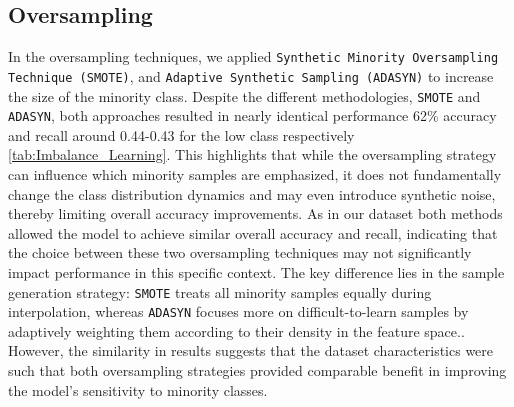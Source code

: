 \subsection{Oversampling}
In the oversampling techniques, we applied \texttt{Synthetic Minority Oversampling Technique (SMOTE)}, 
and \texttt{Adaptive Synthetic Sampling (ADASYN)} to increase the size of the minority class. 
Despite the different methodologies, \texttt{SMOTE} and \texttt{ADASYN}, both approaches resulted in nearly identical performance 62\% accuracy 
and recall around 0.44-0.43 for the low class respectively \ref{tab:Imbalance_Learning}. 
This highlights that while the oversampling strategy can influence which minority samples are emphasized, 
it does not fundamentally change the class distribution dynamics and may even introduce synthetic noise, thereby limiting overall accuracy improvements.
As in our dataset both methods allowed the model to 
achieve similar overall accuracy and recall, indicating that the choice between these two oversampling techniques may not significantly impact performance in this specific context.
The key difference lies in the sample generation strategy: \texttt{SMOTE} treats all minority samples equally during interpolation, 
whereas \texttt{ADASYN} focuses more on difficult-to-learn samples by adaptively weighting them according to their density in the feature space.. 
However, the similarity in results suggests that the dataset characteristics were such that both oversampling strategies provided 
comparable benefit in improving the model's sensitivity to minority classes.


